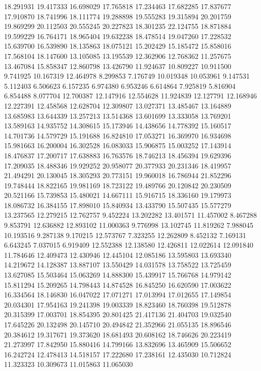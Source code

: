 18.291931
19.417333
16.698029
17.765818
17.234463
17.682285
17.837677
17.910870
18.741996
18.111774
19.288898
19.555283
19.315894
20.201759
19.869299
20.112503
20.555245
20.227823
18.301235
22.124755
18.871884
19.599229
16.764171
18.965404
19.632238
18.478514
19.047260
17.228532
15.639700
16.539890
18.135863
18.075121
15.202429
15.185472
15.858016
17.568104
18.147600
13.105085
13.195539
12.362906
12.768362
11.257675
13.467084
15.858347
12.860798
13.426790
11.924637
10.809227
10.911500
9.741925
10.167319
12.464978
8.299853
7.176749
10.019348
10.053961
9.147531
5.112403
6.506623
6.157235
6.974380
6.953246
6.614864
7.925819
5.816904
6.854488
8.077704
12.700387
12.147916
12.554628
11.924839
12.127791
12.168946
12.227391
12.458568
12.628704
12.309807
13.027371
13.485467
13.164889
13.685983
13.644339
13.257213
13.514368
13.601699
13.333058
13.769201
13.589163
14.935752
14.308615
15.173946
14.438656
14.778392
15.160517
14.701736
14.579729
15.191688
16.824810
17.053271
16.369970
16.934698
15.981663
16.200004
16.302528
16.083033
15.906875
15.003252
17.143914
18.476837
17.200717
17.638883
16.763576
18.746213
18.456394
19.629396
17.209035
18.488346
19.929252
20.958077
20.377933
20.231346
18.419957
21.494291
20.130045
18.305293
20.773151
19.960018
16.786944
21.852296
19.748444
18.822165
19.981169
18.723122
19.489766
20.120842
20.230509
20.521166
15.739853
15.480021
14.667111
15.916715
18.336160
19.179973
18.086732
16.384155
17.898010
15.840934
13.433790
15.507435
15.577279
13.237565
12.279215
12.762757
9.452224
13.202282
13.401571
11.457002
8.467288
9.853791
12.636882
12.893102
11.000363
9.776998
13.102745
11.819262
7.988045
10.193516
9.287138
9.170215
12.573767
7.323255
12.262809
8.452132
7.169131
6.643245
7.037015
6.919409
12.552388
12.138580
12.426811
12.022614
12.091840
11.784646
12.409473
12.430946
12.445104
12.085186
13.595803
13.693340
14.219672
14.128387
13.887107
13.550429
14.031578
13.758522
13.725459
13.627085
15.503464
15.063269
14.888300
15.439917
15.766768
14.979142
15.811294
15.209265
14.798443
14.874528
16.845250
16.620590
17.003622
16.334564
18.146830
16.047022
17.071271
17.013994
17.012655
17.149854
20.034301
17.954163
19.241398
19.003339
18.823460
18.760398
19.512878
20.315399
17.003701
18.854395
20.801425
21.417136
21.404703
19.032540
17.645226
20.132498
20.145710
20.494842
21.352966
21.055135
18.896546
20.384612
19.317671
19.373620
18.681493
20.608162
18.746626
20.223419
21.273997
17.842950
15.880416
14.799166
13.832696
13.465909
15.506652
16.242724
12.478413
14.518157
17.222680
17.238161
12.435030
10.712824
11.323323
10.309673
11.015863
11.065030
